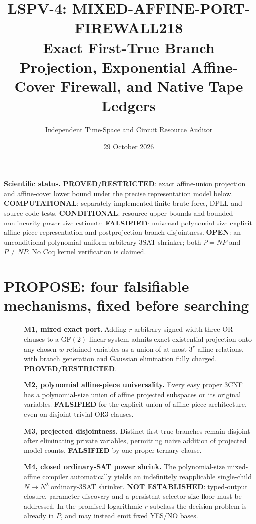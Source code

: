 \documentclass[11pt]{article}
\title{LSPV-4: MIXED-AFFINE-PORT-FIREWALL218\\Exact First-True Branch Projection, Exponential Affine-Cover Firewall, and Native Tape Ledgers}
\author{Independent Time-Space and Circuit Resource Auditor}
\date{29 October 2026}
\begin{document}
\maketitle
\noindent\textbf{Scientific status.} \textbf{PROVED/RESTRICTED}: exact affine-union projection and affine-cover lower bound under the precise representation model below. \textbf{COMPUTATIONAL}: separately implemented finite brute-force, DPLL and source-code tests. \textbf{CONDITIONAL}: resource upper bounds and bounded-nonlinearity power-size estimate. \textbf{FALSIFIED}: universal polynomial-size explicit affine-piece representation and postprojection branch disjointness. \textbf{OPEN}: an unconditional polynomial uniform arbitrary-3SAT shrinker; both $P=NP$ and $P\ne NP$. No Coq kernel verification is claimed.

\section{PROPOSE: four falsifiable mechanisms, fixed before searching}
\begin{description}
\item[]\textbf{M1, mixed exact port.} Adding $r$ arbitrary signed width-three OR clauses to a GF$(2)$ linear system admits exact existential projection onto any chosen $w$ retained variables as a union of at most $3^r$ affine relations, with branch generation and Gaussian elimination fully charged. \textbf{PROVED/RESTRICTED}.
\item[]\textbf{M2, polynomial affine-piece universality.} Every easy proper 3CNF has a polynomial-size union of affine projected subspaces on its original variables. \textbf{FALSIFIED} for the explicit union-of-affine-piece architecture, even on disjoint trivial OR3 clauses.
\item[]\textbf{M3, projected disjointness.} Distinct first-true branches remain disjoint after eliminating private variables, permitting naive addition of projected model counts. \textbf{FALSIFIED} by one proper ternary clause.
\item[]\textbf{M4, closed ordinary-SAT power shrink.} The polynomial-size mixed-affine compiler automatically yields an indefinitely reapplicable single-child $N\mapsto N^\lambda$ ordinary-3SAT shrinker. \textbf{NOT ESTABLISHED}: typed-output closure, parameter discovery and a persistent selector-size floor must be addressed. In the promised logarithmic-$r$ subclass the decision problem is already in $P$, and may instead emit fixed YES/NO bases.
\end{description}
\end{document}
